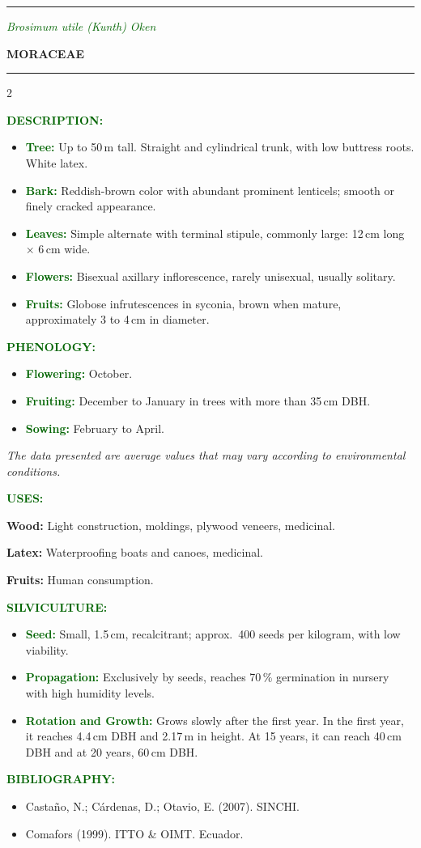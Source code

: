 \documentclass[12pt,a4paper]{article}
\newcommand{\fieldlabel}[1]{\textcolor{darkgreen}{\textbf{#1}}}
\newcommand{\accentrule}{%
  \noindent\textcolor{lightgreen}{\rule{\linewidth}{3pt}}%
}
\newcommand{\speciestitle}[2]{%
  \newpage
  \accentrule\par\vspace{0.3em}
  \begin{center}
    {\fontsize{22}{26}\selectfont\itshape\textcolor{darkgreen}{#1}}\par
    \vspace{0.3em}
    {\large\bfseries\textcolor{titlegray}{#2}}
  \end{center}
  \vspace{0.2em}
  \accentrule\par\vspace{0.8em}
}
\newcommand{\fichasec}[1]{%
  \par\vspace{0.5em}%
  \noindent\textcolor{darkgreen}{\textbf{#1:}}%
  \par\vspace{0.2em}%
}
\newcommand{\phenoitem}[2]{%
  \item \fieldlabel{#1} #2%
}
\begin{document}
\speciestitle{Brosimum utile (Kunth) Oken}{MORACEAE}

\begin{multicols}{2}

\fichasec{DESCRIPTION}
\begin{itemize}
  \item \fieldlabel{Tree:} Up to 50\,m tall. Straight and cylindrical trunk, with low buttress roots. White latex.
  \item \fieldlabel{Bark:} Reddish-brown color with abundant prominent lenticels; smooth or finely cracked appearance.
  \item \fieldlabel{Leaves:} Simple alternate with terminal stipule, commonly large: 12\,cm long $\times$ 6\,cm wide.
  \item \fieldlabel{Flowers:} Bisexual axillary inflorescence, rarely unisexual, usually solitary.
  \item \fieldlabel{Fruits:} Globose infrutescences in syconia, brown when mature, approximately 3 to 4\,cm in diameter.
\end{itemize}

\fichasec{PHENOLOGY}
\begin{itemize}
  \phenoitem{Flowering:}{October.}
  \item \fieldlabel{Fruiting:} December to January in trees with more than 35\,cm DBH.
  \phenoitem{Sowing:}{February to April.}
\end{itemize}
{\footnotesize\textit{The data presented are average values that may vary according to environmental conditions.}}

\fichasec{USES}
\textbf{Wood:} Light construction, moldings, plywood veneers, medicinal.\par
\textbf{Latex:} Waterproofing boats and canoes, medicinal.\par
\textbf{Fruits:} Human consumption.

\columnbreak

\fichasec{SILVICULTURE}
\begin{itemize}
  \item \fieldlabel{Seed:} Small, 1.5\,cm, recalcitrant; approx.\ 400 seeds per kilogram, with low viability.
  \item \fieldlabel{Propagation:} Exclusively by seeds, reaches 70\,\% germination in nursery with high humidity levels.
  \item \fieldlabel{Rotation and Growth:} Grows slowly after the first year. In the first year, it reaches 4.4\,cm DBH and 2.17\,m in height. At 15 years, it can reach 40\,cm DBH and at 20 years, 60\,cm DBH.
\end{itemize}

\fichasec{BIBLIOGRAPHY}
{\footnotesize
\begin{itemize}
  \item Castaño, N.; Cárdenas, D.; Otavio, E. (2007). SINCHI.
  \item Comafors (1999). ITTO \& OIMT. Ecuador.
\end{itemize}
}
\end{multicols}
\end{document}
